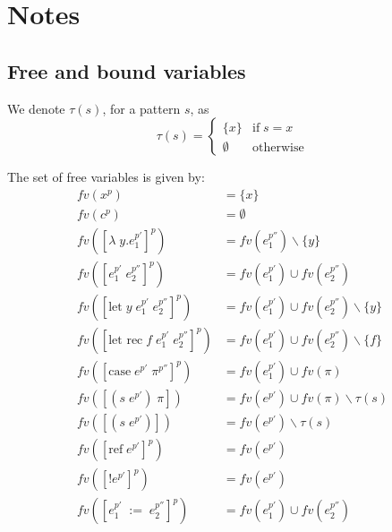 \documentclass[../../master.tex]{subfiles}
\begin{document}
\section{Notes}

\subsection{Free and bound variables}
We denote $\tau(s)$, for a pattern $s$, as
$$
	\tau(s)=
		\left\{\begin{matrix}
			\{x\} & \mbox{if}\;s=x\\ 
			\emptyset & \mbox{otherwise}
		\end{matrix}\right.
$$

\begin{definition}\label{def:fv}
	The set of free variables is given by:
	\begin{align*}
		fv(x^p)&=\{x\}\\
		fv(c^p)&=\emptyset\\
		fv([\lambda\;y.e_1^{p'}]^p)&=fv(e_1^{p''})\backslash\{y\}\\
		fv([e_1^{p'}\;e_2^{p''}]^p)&=fv(e_1^{p'})\cup fv(e_2^{p''})\\
		fv([\mbox{let}\;y\;e_1^{p'}\;e_2^{p''}]^p)&=fv(e_1^{p'})\cup fv(e_2^{p''})\backslash\{y\}\\
		fv([\mbox{let rec}\;f\;e_1^{p'}\;e_2^{p''}]^p)&=fv(e_1^{p'})\cup fv(e_2^{p''})\backslash\{f\}\\
		fv([\mbox{case}\;e^{p'}\;\pi^{p''}]^p)&=fv(e_1^{p'})\cup fv(\pi)\\
		fv([(s\;e^{p'})\;\pi])&=fv(e^{p'})\cup fv(\pi)\backslash\tau(s)\\
		fv([(s\;e^{p'})])&=fv(e^{p'})\backslash\tau(s)\\
		fv([\mbox{ref}\;e^{p'}]^p)&=fv(e^{p'})\\
		fv([!e^{p'}]^p)&=fv(e^{p'})\\
		fv([e_1^{p'}\;:=\;e_2^{p''}]^p)&=fv(e_1^{p'})\cup fv(e_2^{p''})\\
	\end{align*}
\end{definition}
\end{document}

